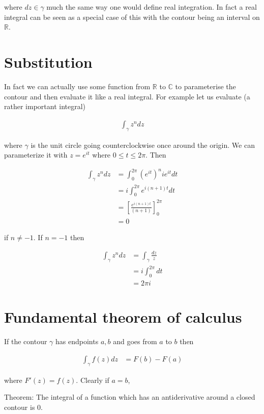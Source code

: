 \documentclass{article}
\begin{document}
where $dz \in \gamma$ much the same way one would define real integration. In fact a real integral can be seen as a special case of this with the contour being an interval on $\mathbb{R}$.

\section{Substitution}

In fact we can actually use some function from $\mathbb{R}$ to $\mathbb{C}$ to parameterise the contour and then evaluate it like a real integral. For example let us evaluate (a rather important integral)

\begin{align}
\int_\gamma z^n dz
\end{align}

where $\gamma$ is the unit circle going counterclockwise once around the origin. We can parameterize it with $z=e^{it}$ where $0 \leq t \leq 2\pi$. Then

\begin{align}
\int_\gamma z^n dz &= \int_0^{2\pi} (e^{it})^nie^{it} dt \\
                   &= i \int_0^{2\pi} e^{i(n+1)t} dt \\
                   &= \left[\frac{e^{i(n+1)t}}{(n+1)}\right]_0^{2\pi} \\
                   &= 0
\end{align}

if $n \neq -1$. If $n=-1$ then

\begin{align}
\int_\gamma z^n dz &= \int_\gamma \frac{dz}{z} \\
                   &= i \int_0^{2\pi} dt \\
                   &= 2\pi i
\end{align}

\section{Fundamental theorem of calculus}

If the contour $\gamma$ has endpoints $a,b$ and goes from $a$ to $b$ then

\begin{align}
\int_\gamma f(z) dz &= F(b) - F(a)
\end{align}

where $F'(z) = f(z)$. Clearly if $a=b$,

Theorem: The integral of a function which has an antiderivative around a closed contour is 0.
\end{document}

